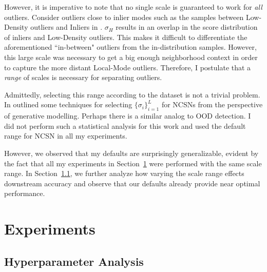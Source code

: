 However, it is imperative to note that no single scale is guaranteed to work for \textit{all} outliers. Consider outliers close to inlier modes such as the samples between Low-Density outliers and Inliers in . $\sigma_H$ results in an overlap in the score distribution of inliers and Low-Density outliers. This makes it difficult to differentiate the aforementioned ``in-between" outliers from the in-distribution samples. However, this large scale was necessary to get a big enough neighborhood context in order to capture the more distant Local-Mode outliers. Therefore, I postulate that a \emph{range} of scales is necessary for separating outliers.

Admittedly, selecting this range according to the dataset is not a trivial problem. In  outlined some techniques for selecting $\{\sigma_i\}_{i=1}^L$ for NCSNs from the perspective of generative modelling. Perhaps there is a similar analog to OOD detection. I did not perform such a statistical analysis for this work and used the default range for NCSN in all my experiments. 

However, we observed that my defaults are surprisingly generalizable, evident by the fact that all my experiments in Section~\ref{experiments} were performed with the same scale range. In Section~\ref{hyperparams}, we further analyze how varying the scale range effects downstream accuracy and observe that our defaults already provide near optimal performance.

\section{Experiments}
\label{experiments}

\subsection{Hyperparameter Analysis}
\label{hyperparams}